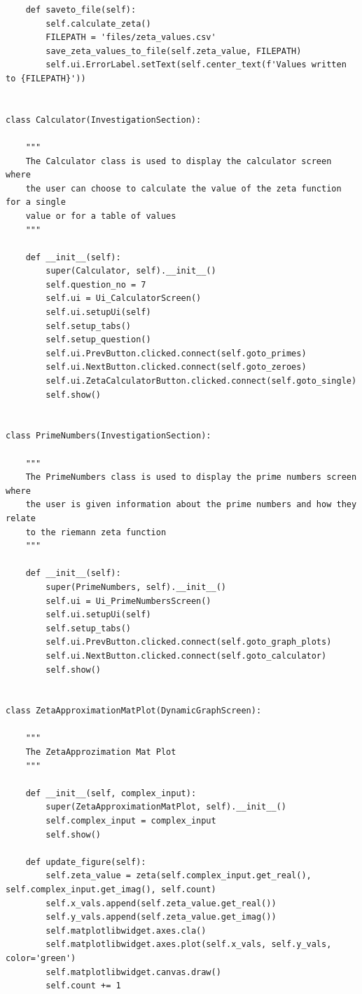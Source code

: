 \documentclass{article}
\begin{document}
\begin{lstlisting}
    def saveto_file(self):
        self.calculate_zeta()
        FILEPATH = 'files/zeta_values.csv'
        save_zeta_values_to_file(self.zeta_value, FILEPATH)
        self.ui.ErrorLabel.setText(self.center_text(f'Values written to {FILEPATH}'))


class Calculator(InvestigationSection):

    """
    The Calculator class is used to display the calculator screen where
    the user can choose to calculate the value of the zeta function for a single
    value or for a table of values
    """

    def __init__(self):
        super(Calculator, self).__init__()
        self.question_no = 7
        self.ui = Ui_CalculatorScreen()
        self.ui.setupUi(self)
        self.setup_tabs()
        self.setup_question()
        self.ui.PrevButton.clicked.connect(self.goto_primes)
        self.ui.NextButton.clicked.connect(self.goto_zeroes)
        self.ui.ZetaCalculatorButton.clicked.connect(self.goto_single)
        self.show()


class PrimeNumbers(InvestigationSection):

    """
    The PrimeNumbers class is used to display the prime numbers screen where
    the user is given information about the prime numbers and how they relate
    to the riemann zeta function
    """

    def __init__(self):
        super(PrimeNumbers, self).__init__()
        self.ui = Ui_PrimeNumbersScreen()
        self.ui.setupUi(self)
        self.setup_tabs()
        self.ui.PrevButton.clicked.connect(self.goto_graph_plots)
        self.ui.NextButton.clicked.connect(self.goto_calculator)
        self.show()


class ZetaApproximationMatPlot(DynamicGraphScreen):

    """
    The ZetaApprozimation Mat Plot
    """

    def __init__(self, complex_input):
        super(ZetaApproximationMatPlot, self).__init__()
        self.complex_input = complex_input
        self.show()

    def update_figure(self):
        self.zeta_value = zeta(self.complex_input.get_real(), self.complex_input.get_imag(), self.count)
        self.x_vals.append(self.zeta_value.get_real())
        self.y_vals.append(self.zeta_value.get_imag())
        self.matplotlibwidget.axes.cla()
        self.matplotlibwidget.axes.plot(self.x_vals, self.y_vals, color='green')
        self.matplotlibwidget.canvas.draw()
        self.count += 1



\end{lstlisting}
\end{document}
